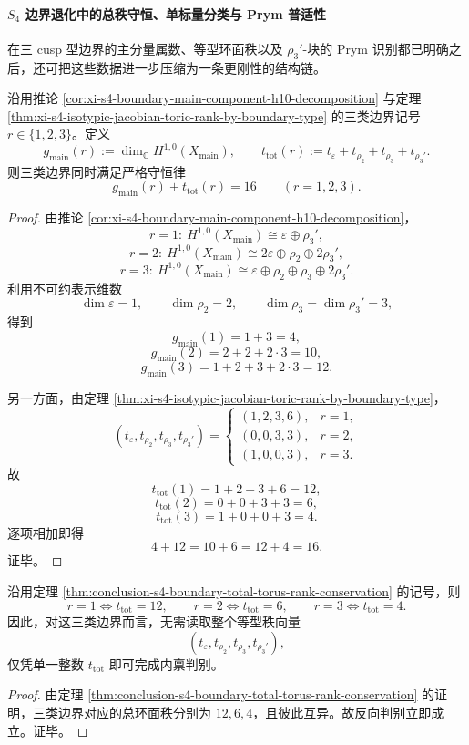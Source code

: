 \paragraph{\texorpdfstring{$S_4$}{S4} 边界退化中的总秩守恒、单标量分类与 Prym 普适性}
在三 cusp 型边界的主分量属数、等型环面秩以及 \(\rho_3'\)-块的 Prym 识别都已明确之后，还可把这些数据进一步压缩为一条更刚性的结构链。

\begin{theorem}[半稳定边界上的总环面秩守恒律]\label{thm:conclusion-s4-boundary-total-torus-rank-conservation}
沿用推论 \ref{cor:xi-s4-boundary-main-component-h10-decomposition} 与定理 \ref{thm:xi-s4-isotypic-jacobian-toric-rank-by-boundary-type} 的三类边界记号 \(r\in\{1,2,3\}\)。定义
\[
g_{\mathrm{main}}(r):=\dim_{\mathbb C}H^{1,0}(X_{\mathrm{main}}),
\qquad
t_{\mathrm{tot}}(r):=t_{\varepsilon}+t_{\rho_2}+t_{\rho_3}+t_{\rho_3'}.
\]
则三类边界同时满足严格守恒律
\[
\boxed{\;
g_{\mathrm{main}}(r)+t_{\mathrm{tot}}(r)=16
\qquad (r=1,2,3).\;}
\]
\end{theorem}
\begin{proof}
由推论 \ref{cor:xi-s4-boundary-main-component-h10-decomposition}，
\[
r=1:\ H^{1,0}(X_{\mathrm{main}})\cong \varepsilon\oplus \rho_3',
\]
\[
r=2:\ H^{1,0}(X_{\mathrm{main}})\cong 2\varepsilon\oplus \rho_2\oplus 2\rho_3',
\]
\[
r=3:\ H^{1,0}(X_{\mathrm{main}})\cong \varepsilon\oplus \rho_2\oplus \rho_3\oplus 2\rho_3'.
\]
利用不可约表示维数
\[
\dim\varepsilon=1,\qquad
\dim\rho_2=2,\qquad
\dim\rho_3=\dim\rho_3'=3,
\]
得到
\[
g_{\mathrm{main}}(1)=1+3=4,
\]
\[
g_{\mathrm{main}}(2)=2+2+2\cdot 3=10,
\]
\[
g_{\mathrm{main}}(3)=1+2+3+2\cdot 3=12.
\]

另一方面，由定理 \ref{thm:xi-s4-isotypic-jacobian-toric-rank-by-boundary-type}，
\[
(t_{\varepsilon},t_{\rho_2},t_{\rho_3},t_{\rho_3'})
=
\begin{cases}
(1,2,3,6),& r=1,\\
(0,0,3,3),& r=2,\\
(1,0,0,3),& r=3.
\end{cases}
\]
故
\[
t_{\mathrm{tot}}(1)=1+2+3+6=12,
\]
\[
t_{\mathrm{tot}}(2)=0+0+3+3=6,
\]
\[
t_{\mathrm{tot}}(3)=1+0+0+3=4.
\]
逐项相加即得
\[
4+12=10+6=12+4=16.
\]
证毕。
\end{proof}

\begin{corollary}[边界类型由总环面秩单独决定]\label{cor:conclusion-s4-boundary-type-by-total-toric-rank}
沿用定理 \ref{thm:conclusion-s4-boundary-total-torus-rank-conservation} 的记号，则
\[
\boxed{\;
r=1 \iff t_{\mathrm{tot}}=12,\qquad
r=2 \iff t_{\mathrm{tot}}=6,\qquad
r=3 \iff t_{\mathrm{tot}}=4.\;}
\]
因此，对这三类边界而言，无需读取整个等型秩向量
\[
(t_{\varepsilon},t_{\rho_2},t_{\rho_3},t_{\rho_3'}),
\]
仅凭单一整数 \(t_{\mathrm{tot}}\) 即可完成内禀判别。
\end{corollary}
\begin{proof}
由定理 \ref{thm:conclusion-s4-boundary-total-torus-rank-conservation} 的证明，三类边界对应的总环面秩分别为 \(12,6,4\)，且彼此互异。故反向判别立即成立。证毕。
\end{proof}

